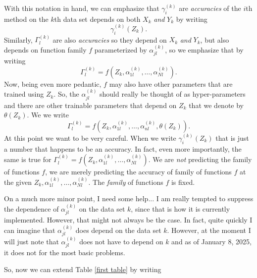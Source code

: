 \documentclass{article}
\begin{document}
With this notation in hand, we can emphasize that $\gamma_i^{(k)}$ are \emph{accuracies} of the $i$th method on the $k$th data set depends on both $X_k$ \emph{and} $Y_k$ by writing 
\begin{equation*}
\gamma_i^{(k)}(Z_k).
\end{equation*}
Similarly, $\Gamma_l^{(k)}$ are also \emph{accuracies} so they depend on $X_k$ \emph{and} $Y_k$, but also depends on function family $f$ parameterized by $\alpha_{jl}^{(k)}$, so we emphasize that by writing 
\begin{equation*}
\Gamma_l^{(k)} = f(Z_k,\alpha_{1l}^{(k)},\dots, \alpha_{Nl}^{(k)}).
\end{equation*}
Now, being even more pedantic, $f$ may also have other parameters that are trained using $Z_k$.  So, the $\alpha_{jl}^{(k)}$ should really be thought of as hyper-parameters and there are 
other trainable parameters that depend on $Z_k$ that we denote by $\theta(Z_k)$.  We we write
\begin{equation*}
\Gamma_l^{(k)} = f(Z_k,\alpha_{1l}^{(k)},\dots, \alpha_{nl}^{(k)}, \theta(Z_k)).
\end{equation*}
At this point we want to be very careful.  When we write $\gamma_i^{(k)}(Z_k)$ that is just a number that happens to be an accuracy.  In fact, even more importantly, the same is true for $\Gamma_l^{(k)}=f(Z_k,\alpha_{1l}^{(k)},\dots, \alpha_{Nl}^{(k)})$.  We are \emph{not} predicting the family of functions $f$, we are merely predicting the accuracy of family of functions $f$ at the given $Z_k,\alpha_{1l}^{(k)},\dots, \alpha_{Nl}^{(k)}$.  The \emph{family} of functions $f$ is fixed.

\bigskip
On a much more minor point, I need some help... I am really tempted to suppress the dependence of $\alpha_{jl}^{(k)}$ on the data set $k$, since that is how it is currently implemented.  However, that might not always be the case.  In fact, quite quickly I can imagine that $\alpha_{jl}^{(k)}$ does depend on the data set $k$.  However, at the moment I will just note that $\alpha_{jl}^{(k)}$ does not have to depend on $k$ and as of January 8, 2025, it does not for the most basic problems.
\bigskip

\bigskip
So, now we can extend Table \ref{first table} by writing
\end{document}
